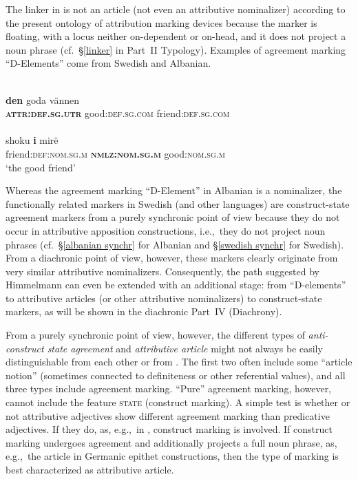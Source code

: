 The linker in  is not an article (not even an attributive nominalizer) according to the present ontology of attribution marking devices because the marker is floating, with a locus neither on-dependent or on-head, and it does not project a noun phrase (cf.~\S\ref{linker} in Part~II Typology). Examples of agreement marking “D-Elements” come from Swedish and Albanian.
\begin{exe}
\ex
\begin{xlist}
\ex 
{}\\
\gll	\textbf{den} goda vännen\\
	\textbf{\textsc{attr:def.sg.utr}} good:\textsc{def.sg.com} friend:\textsc{def.sg.com}\\
\ex 
{}\\
\gll	shoku \textbf{i} mirë\\
	friend:\textsc{def:nom.sg.m} \textbf{\textsc{nmlz:nom.sg.m}} good:\textsc{nom.sg.m}\\
\glt	‘the good friend’
\end{xlist}
\end{exe}
Whereas the agreement marking “D-Element” in Albanian is a nominalizer, the functionally related markers in Swedish (and other languages) are construct-state agreement markers from a purely synchronic point of view because they do not occur in attributive apposition constructions, i.e.,~they do not project noun phrases (cf.~\S\ref{albanian synchr} for Albanian and \S\ref{swedish synchr} for Swedish). From a diachronic point of view, however, these markers clearly originate from very similar attributive nominalizers. Consequently, the  path suggested by Himmelmann \citeyear{himmelmann1997} can even be extended with an additional stage: from “D-elements” to attributive articles (or other attributive nominalizers) to construct-state markers, as will be shown in the diachronic Part~IV (Diachrony).

From a purely synchronic point of view, however, the different types of \emph{anti\hyp{}construct state agreement} and \emph{attributive article} might not always be easily distinguishable from each other or from \emph{}. The first two often include some “article notion” (sometimes connected to definiteness or other referential values), and all three types include agreement marking. “Pure” agreement marking, however, cannot include the feature \textsc{state} (construct marking). A simple test is whether or not attributive adjectives show different agreement marking than predicative adjectives. If they do, as, e.g.,~in , construct marking is involved. If construct marking undergoes agreement and additionally projects a full noun phrase, as, e.g.,~the article in Germanic epithet constructions, then the type of marking is best characterized as attributive article.

